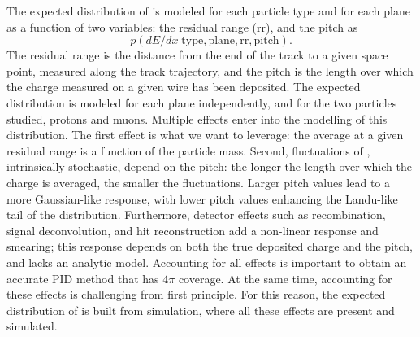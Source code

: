 The expected distribution of \dedx is modeled for each particle type and for each plane as a function of two variables: the residual range (rr), and the pitch as
\[ p(dE/dx | \text{type}, \text{plane}, \text{rr}, \text{pitch}). \]
The residual range is the distance from the end of the track to a given space point, measured along the track trajectory, and the pitch is the length over which the charge measured on a given wire has been deposited.
The expected distribution is modeled for each plane independently, and for the two particles studied, protons and muons.
Multiple effects enter into the modelling of this distribution.
The first effect is what we want to leverage: the average \dedx at a given residual range is a function of the particle mass.
Second, fluctuations of \dedx, intrinsically stochastic, depend on the pitch: the longer the length over which the charge is averaged, the smaller the fluctuations. Larger pitch values lead to a more Gaussian-like \dedx response, with lower pitch values enhancing the Landu-like tail of the \dedx distribution.
Furthermore, detector effects such as recombination, signal deconvolution, and hit reconstruction add a non-linear response and smearing; this response depends on both the true deposited charge and the pitch, and lacks an analytic model. 
Accounting for all effects is important to obtain an accurate PID method that has $4\pi$ coverage. At the same time, accounting for these effects is challenging from first principle. For this reason, the expected distribution of \dedx is built from simulation, where all these effects are present and simulated.

